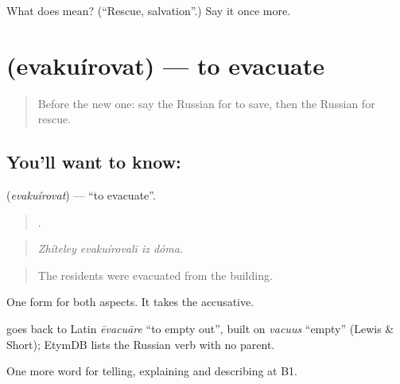 \begin{tcolorbox}[breakable,colback=teal!4,colframe=teal!35!black,title={Before you move on}]
What does  mean? (\textquotedblleft{}Rescue, salvation\textquotedblright{}.) Say it once more.
\end{tcolorbox}
\section[\texorpdfstring{\ru{эвакуировать} (evakuírovat)}{эвакуировать (evakuírovat)}]{ (evakuírovat) — to evacuate}

\label{lesson:RU-C296-evakuirovat}



\begin{quote}
Before the new one: say the Russian for to save, then the Russian for rescue.
\end{quote}

\subsection*{You'll want to know: }
\textbf{} (\emph{evakuírovat}) — \textquotedblleft{}to evacuate\textquotedblright{}.

\begin{quote}
   .
\end{quote}

\begin{quote}
\emph{Zhíteley evakuírovali iz dóma.}
\end{quote}

\begin{quote}
The residents were evacuated from the building.
\end{quote}

One form for both aspects. It takes the accusative.

\begin{cousinweb}
\emph{} goes back to Latin \emph{ēvacuāre} \textquotedblleft{}to empty out\textquotedblright{}, built on \emph{vacuus} \textquotedblleft{}empty\textquotedblright{} (Lewis \& Short); EtymDB lists the Russian verb with no parent.
\end{cousinweb}

\begin{grammarlens}[title={What you've built}]
One more word for telling, explaining and describing at B1.
\end{grammarlens}

